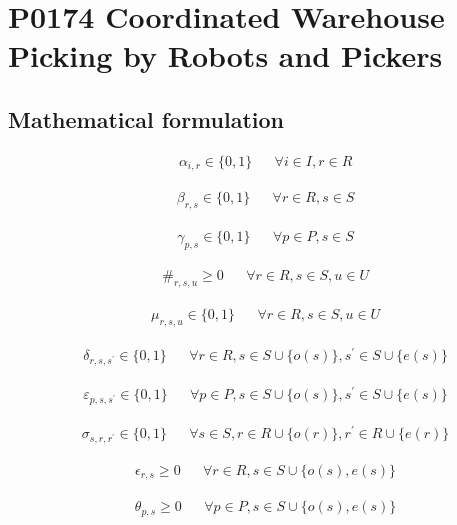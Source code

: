 \documentclass[10pt]{article}
\begin{document}
\section*{P0174 Coordinated Warehouse Picking by Robots and Pickers}
\subsection*{Mathematical formulation}
\[\begin{aligned}&\alpha_{i, r} \in \{0, 1\} && \forall i \in I, r \in R\end{aligned}\]

\[\begin{aligned}&\beta_{r, s} \in \{0, 1\} && \forall r \in R, s \in S\end{aligned}\]

\[\begin{aligned}&\gamma_{p, s} \in \{0, 1\} && \forall p \in P, s \in S\end{aligned}\]

\[\begin{aligned}&\#_{r, s, u} \ge 0 && \forall r \in R, s \in S, u \in U\end{aligned}\]

\[\begin{aligned}&\mu_{r, s, u} \in \{0, 1\} && \forall r \in R, s \in S, u \in U\end{aligned}\]

\[\begin{aligned}&\delta_{r, s, s^{\prime}} \in \{0, 1\} && \forall r \in R, s \in S \cup \{o(s)\}, s^{\prime} \in S \cup \{e(s)\}\end{aligned}\]

\[\begin{aligned}&\varepsilon_{p, s, s^{\prime}} \in \{0, 1\} && \forall p \in P, s \in S \cup \{o(s)\}, s^{\prime} \in S \cup \{e(s)\}\end{aligned}\]

\[\begin{aligned}&\sigma_{s, r, r^{\prime}} \in \{0, 1\} && \forall s \in S, r \in R \cup \{o(r)\}, r^{\prime} \in R \cup \{e(r)\}\end{aligned}\]

\[\begin{aligned}&\epsilon_{r, s} \ge 0 && \forall r \in R, s \in S \cup \{o(s), e(s)\}\end{aligned}\]

\[\begin{aligned}&\theta_{p, s} \ge 0 && \forall p \in P, s \in S \cup \{o(s), e(s)\}\end{aligned}\]
\end{document}
